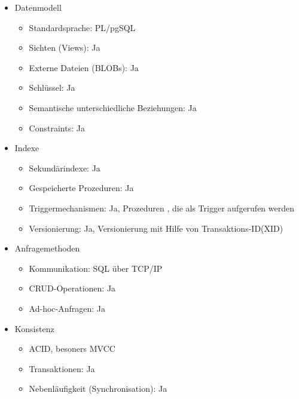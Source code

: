 \begin{itemize}
        \newpage
        \item Datenmodell
        \begin{itemize}
            \item Standardsprache: PL/pgSQL %
            \item Sichten (Views): Ja
            \item Externe Dateien (BLOBs): Ja
            \item Schlüssel: Ja
            \item Semantische unterschiedliche Beziehungen: Ja
            \item Constraints: Ja
        \end{itemize}
        \item Indexe
        \begin{itemize}
            \item Sekundärindexe: Ja
            \item Gespeicherte Prozeduren: Ja
            \item Triggermechanismen: Ja, Prozeduren , die als Trigger aufgerufen werden %
            \item Versionierung: Ja, Versionierung mit Hilfe von Transaktions-ID(XID) %
        \end{itemize}
        \item Anfragemethoden
        \begin{itemize}
            \item Kommunikation: \ac{SQL} über \ac{TCP}/\ac{IP}
            \item \ac{CRUD}-Operationen: Ja
            \item Ad-hoc-Anfragen: Ja
        \end{itemize}
        \item Konsistenz
        \begin{itemize}
            \item \ac{ACID}, besoners \ac{MVCC}
            \item Transaktionen: Ja
            \item Nebenläufigkeit (Synchronisation): Ja

\end{itemize}
\end{itemize}
